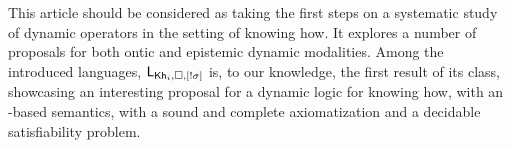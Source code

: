 \begin{comment}
Another aspect unexploited by the ontic proposals, is the dimension involving plan indistinguishability, the most distinctive feature of our semantics. In this regard, we proposed modalities that remove indistinguishability between plans, reducing the uncertainty of an agent. Similar to what happened to very general dynamic modalities (see e.g.~\cite{ArecesFH15}), axiomatizing these operators turns to be challenging. We showed that for instance in our proposals, uniforme substitution does not hold. To overcome this issue, we propose a new logic featuring two novel operations: a basic modality $[a]$, and a novel dynamic modality that distinguishes the effect of a plan from the rest. The latter emerges as an alternative of more expressive operators, but in which the information about a single plan is revealed, instead of information about two plans being different. For the former, the benefits are twofold. First, it enables us to explicitly talk about the execution of actions. Second, as a by product it provides us the expressivity to obtain an axiomatization via reduction axioms.
\end{comment}

\begin{comment}
To the best of our knowledge, this is the first attempt to establish a theory of dynamic epistemic logics for knowing how. We argue that the semantics provided in~\cite{AFSVQ21,AFSVQ23report} is the crucial aspect for succeeding in this goal. Moreover, our work opens the path to studying other dynamic operators in this context. For instance, we could define dynamic modalities based on action models, like those in~\cite{BaltagMS98,DELbook,GalimullinA22}. 
Also, it would be interesting to explore alternative techniques for obtaining proof systems without a general rule of substitution, for instance, by building a dynamic logic over a hybrid logic semantics (see e.g.~\cite{BenthemMZ2022}). Finally, we would like to characterize the exact complexity of the dynamic logics we introduced.
\end{comment}


This article should be considered as taking the first steps on a systematic study of dynamic operators in the setting of knowing how.  It explores a number of proposals for both ontic and epistemic dynamic modalities. 
Among the introduced languages, $\mathsf{L}_{{\sf Kh}_i,\square,[!\sigma]}$ is,  to our knowledge, the first result of its class, showcasing an interesting proposal for a dynamic logic for knowing how, with an \ults-based semantics, with a sound and complete axiomatization and a decidable satisfiability problem. 


